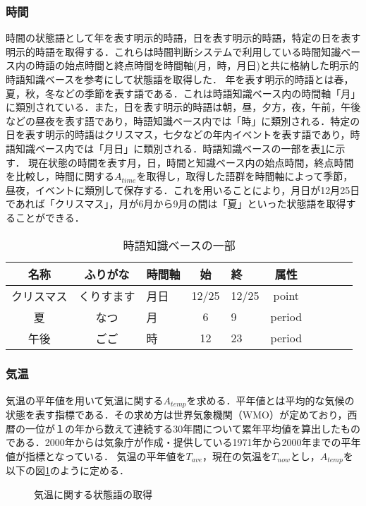 \subsubsection{時間}
時間の状態語として年を表す明示的時語，日を表す明示的時語，特定の日を表す明示的時語を取得する．これらは時間判断システムで利用している時間知識ベース内の時語の始点時間と終点時間を時間軸(月，時，月日)と共に格納した明示的時語知識ベースを参考にして状態語を取得した．
年を表す明示的時語とは春，夏，秋，冬などの季節を表す語である．これは時語知識ベース内の時間軸「月」に類別されている．また，日を表す明示的時語は朝，昼，夕方，夜，午前，午後などの昼夜を表す語であり，時語知識ベース内では「時」に類別される．特定の日を表す明示的時語はクリスマス，七夕などの年内イベントを表す語であり，時語知識ベース内では「月日」に類別される．時語知識ベースの一部を表\ref{tb:zigochishiki}に示す．
現在状態の時間を表す月，日，時間と知識ベース内の始点時間，終点時間を比較し，時間に関する$A_{time}$を取得し，取得した語群を時間軸によって季節，昼夜，イベントに類別して保存する．これを用いることにより，月日が12月25日であれば「クリスマス」，月が6月から9月の間は「夏」といった状態語を取得することができる．

\begin{table}[htbp]
    \begin{center}
      \caption{時語知識ベースの一部}
      \label{tb:zigochishiki}
      \begin{tabular}{c|clclclclc}
        \hline
        名称		& ふりがな	& 時間軸	& 始	& 終	& 属性 \\
        \hline
		クリスマス	& くりすます& 月日		& 12/25	& 12/25	& point \\
		夏			& なつ		& 月		& 6		& 9		& period \\
		午後		& ごご		& 時		& 12	& 23	& period \\
        \hline
      \end{tabular}
    \end{center}
\end{table}

\subsubsection{気温}
気温の平年値を用いて気温に関する$A_{temp}$を求める．平年値とは平均的な気候の状態を表す指標である．その求め方は世界気象機関（WMO）が定めており，西暦の一位が１の年から数えて連続する30年間について累年平均値を算出したものである．2000年からは気象庁が作成・提供している1971年から2000年までの平年値が指標となっている．
気温の平年値を$T_{ave}$，現在の気温を$T_{now}$とし，$A_{temp}$を以下の図\ref{fig:tempzyotai}のように定める．
\begin{figure}[htbp]
	\begin{center}
	  	\epsfxsize=10cm
		\caption{気温に関する状態語の取得}
		\label{fig:tempzyotai}
	\end{center}
\end{figure}


